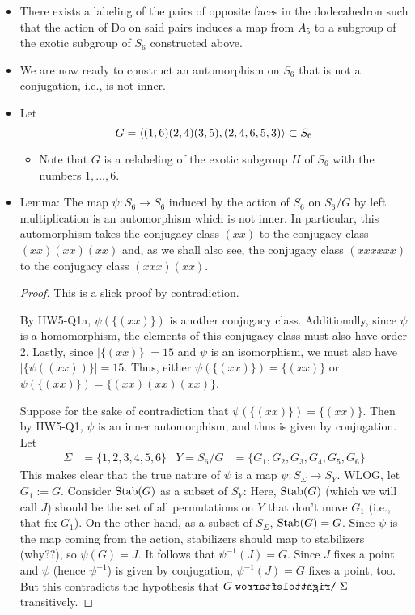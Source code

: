 \documentclass[../notes.tex]{subfiles}
\begin{document}
\begin{itemize}
\begin{itemize}
    \end{itemize}
    \item There exists a labeling of the pairs of opposite faces in the dodecahedron such that the action of $\text{Do}$ on said pairs induces a map from $A_5$ to a subgroup of the exotic subgroup of $S_6$ constructed above.
    \item We are now ready to construct an automorphism on $S_6$ that is not a conjugation, i.e., is not inner.
    \item Let
    \begin{equation*}
        G = \left\langle{(1,6)(2,4)(3,5),(2,4,6,5,3)}\right\rangle \subset S_6
    \end{equation*}
    \begin{itemize}
        \item Note that $G$ is a relabeling of the exotic subgroup $H$ of $S_6$ with the numbers $1,\dots,6$.
    \end{itemize}
    \item Lemma: The map $\psi:S_6\to S_6$ induced by the action of $S_6$ on $S_6/G$ by left multiplication is an automorphism which is not inner. In particular, this automorphism takes the conjugacy class $(xx)$ to the conjugacy class $(xx)(xx)(xx)$ and, as we shall also see, the conjugacy class $(xxxxxx)$ to the conjugacy class $(xxx)(xx)$.
    \begin{proof}
        This is a slick proof by contradiction.\par\smallskip
        By HW5-Q1a, $\psi(\{(xx)\})$ is another conjugacy class. Additionally, since $\psi$ is a homomorphism, the elements of this conjugacy class must also have order 2. Lastly, since $|\{(xx)\}|=15$ and $\psi$ is an isomorphism, we must also have $|\{\psi((xx))\}|=15$. Thus, either $\psi(\{(xx)\})=\{(xx)\}$ or $\psi(\{(xx)\})=\{(xx)(xx)(xx)\}$.\par
        Suppose for the sake of contradiction that $\psi(\{(xx)\})=\{(xx)\}$. Then by HW5-Q1, $\psi$ is an inner automorphism, and thus is given by conjugation. Let
        \begin{align*}
            \Sigma &= \{1,2,3,4,5,6\}&
            Y = S_6/G &= \{G_1,G_2,G_3,G_4,G_5,G_6\}
        \end{align*}
        This makes clear that the true nature of $\psi$ is a map $\psi:S_\Sigma\to S_Y$. WLOG, let $G_1:=G$. Consider $\operatorname{Stab}(G)$ as a subset of $S_Y$: Here, $\operatorname{Stab}(G)$ (which we will call $J$) should be the set of all permutations on $Y$ that don't move $G_1$ (i.e., that fix $G_1$). On the other hand, as a subset of $S_\Sigma$, $\operatorname{Stab}(G)=G$. Since $\psi$ is the map coming from the action, stabilizers should map to stabilizers (why??), so $\psi(G)=J$. It follows that $\psi^{-1}(J)=G$. Since $J$ fixes a point and $\psi$ (hence $\psi^{-1}$) is given by conjugation, $\psi^{-1}(J)=G$ fixes a point, too. But this contradicts the hypothesis that $G\acts\Sigma$ transitively.

\end{proof}
\end{itemize}
\end{document}
